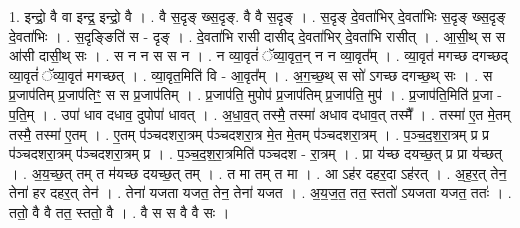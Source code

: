 \documentclass[17pt]{extarticle}
\begin{document}
1. इन्द्रो॒ वै वा इन्द्र॒ इन्द्रो॒ वै । . वै स॒दृङ् ख्स॒दृङ्. वै वै स॒दृङ् । . स॒दृङ् दे॒वता॑भिर् दे॒वता॑भिः स॒दृङ् ख्स॒दृङ् दे॒वता॑भिः । . स॒दृङ्ङिति॑ स - दृङ् । . दे॒वता॑भि रासी दासीद् दे॒वता॑भिर् दे॒वता॑भि रासीत् । . आ॒सी॒थ् स स आ॑सी दासी॒थ् सः । . स न न स स न । . न व्या॒वृतं॑ ॅव्या॒वृत॒न् न न व्या॒वृत᳚म् । . व्या॒वृत॑ मगच्छ दगच्छद् व्या॒वृतं॑ ॅव्या॒वृत॑ मगच्छत् । . व्या॒वृत॒मिति॑ वि - आ॒वृत᳚म् । . अ॒ग॒च्छ॒थ् स सो॑ ऽगच्छ दगच्छ॒थ् सः । . स प्र॒जाप॑तिम् प्र॒जाप॑तिꣳ॒॒ स स प्र॒जाप॑तिम् । . प्र॒जाप॑ति॒ मुपोप॑ प्र॒जाप॑तिम् प्र॒जाप॑ति॒ मुप॑ । . प्र॒जाप॑ति॒मिति॑ प्र॒जा - प॒ति॒म् । . उपा॑ धाव दधाव॒ दुपोपा॑ धावत् । . अ॒धा॒व॒त् तस्मै॒ तस्मा॑ अधाव दधाव॒त् तस्मै᳚ । . तस्मा॑ ए॒त मे॒तम् तस्मै॒ तस्मा॑ ए॒तम् । . ए॒तम् प॑ञ्चदशरा॒त्रम् प॑ञ्चदशरा॒त्र मे॒त मे॒तम् प॑ञ्चदशरा॒त्रम् । . प॒ञ्च॒द॒श॒रा॒त्रम् प्र प्र प॑ञ्चदशरा॒त्रम् प॑ञ्चदशरा॒त्रम् प्र । . प॒ञ्च॒द॒श॒रा॒त्रमिति॑ पञ्चदश - रा॒त्रम् । . प्रा य॑च्छ दयच्छ॒त् प्र प्रा य॑च्छत् । . अ॒य॒च्छ॒त् तम् त म॑यच्छ दयच्छ॒त् तम् । . त मा तम् त मा । . आ ऽह॑र दहर॒दा ऽह॑रत् । . अ॒ह॒र॒त् तेन॒ तेना॑ हर दहर॒त् तेन॑ । . तेना॑ यजता यजत॒ तेन॒ तेना॑ यजत । . अ॒य॒ज॒त॒ तत॒ स्ततो॑ ऽयजता यजत॒ ततः॑ । . ततो॒ वै वै तत॒ स्ततो॒ वै । . वै स स वै वै सः । \newline
\end{document}
